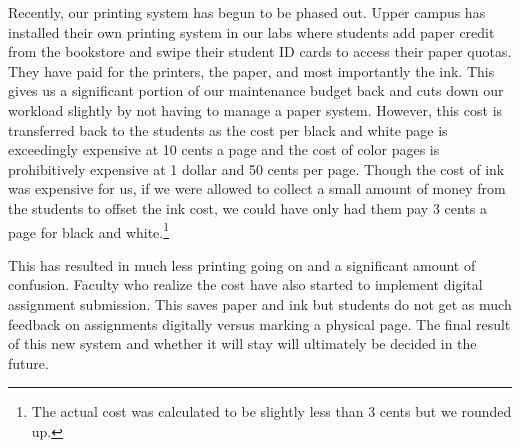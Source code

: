 Recently, our printing system has begun to be phased out.  Upper campus has installed their own printing system in our labs where students add paper credit from the bookstore and swipe their student ID cards to access their paper quotas.  They have paid for the printers, the paper, and most importantly the ink.  This gives us a significant portion of our maintenance budget back and cuts down our workload slightly by not having to manage a paper system.  However, this cost is transferred back to the students as the cost per black and white page is exceedingly expensive at 10 cents a page and the cost of color pages is prohibitively expensive at 1 dollar and 50 cents per page.  Though the cost of ink was expensive for us, if we were allowed to collect a small amount of money from the students to offset the ink cost, we could have only had them pay 3 cents a page for black and white.\footnote{The actual cost was calculated to be slightly less than 3 cents but we rounded up.}  

This has resulted in much less printing going on and a significant amount of confusion.  Faculty who realize the cost have also started to implement digital assignment submission.  This saves paper and ink but students do not get as much feedback on assignments digitally versus marking a physical page.  The final result of this new system and whether it will stay will ultimately be decided in the future.  
